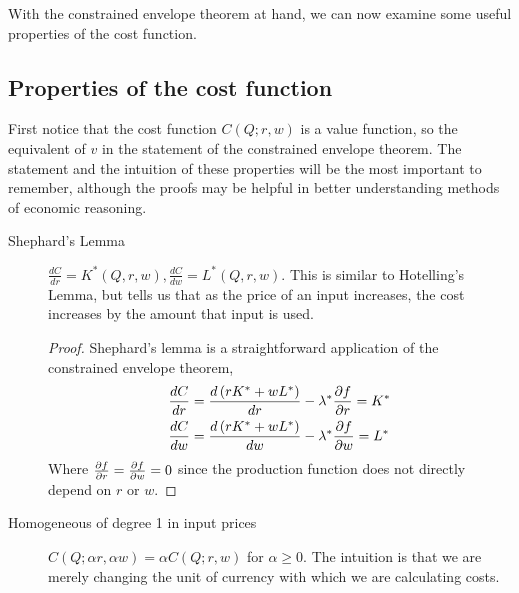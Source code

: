 With the constrained envelope theorem at hand, we can now examine some useful properties of the cost function.

\subsection*{Properties of the cost function} \label{sec:cost_properties}
First notice that the cost function $C(Q; r, w)$ is a value function, so the equivalent of $v$ in the statement of the constrained envelope theorem. The statement and the intuition of these properties will be the most important to remember, although the proofs may be helpful in better understanding methods of economic reasoning.
\begin{description}
    \item[Shephard's Lemma] $\frac{dC}{dr} = K^*(Q, r, w), \frac{dC}{dw} = L^*(Q, r, w)$. This is similar to Hotelling's Lemma, but tells us that as the price of an input increases, the cost increases by the amount that input is used.
    
    \begin{proof}
        Shephard's lemma is a straightforward application of the constrained envelope theorem,
        \begin{align*}
            \frac{dC}{dr} &= \frac{d\left(rK^* + wL^*\right)}{dr} - \lambda^* \frac{\partial f}{\partial r} = K^* \\
            \frac{dC}{dw} &= \frac{d\left(rK^* + wL^*\right)}{dw} - \lambda^* \frac{\partial f}{\partial w} = L^*
        \end{align*}
        Where $\frac{\partial f}{\partial r} = \frac{\partial f}{\partial w} = 0$ since the production function does not directly depend on $r$ or $w$.
    \end{proof} 
    \item[Homogeneous of degree 1 in input prices] $C(Q; \alpha r, \alpha w) = \alpha C(Q; r, w)$ for $\alpha \geq 0$. The intuition is that we are merely changing the unit of currency with which we are calculating costs. 
    

\end{description}
